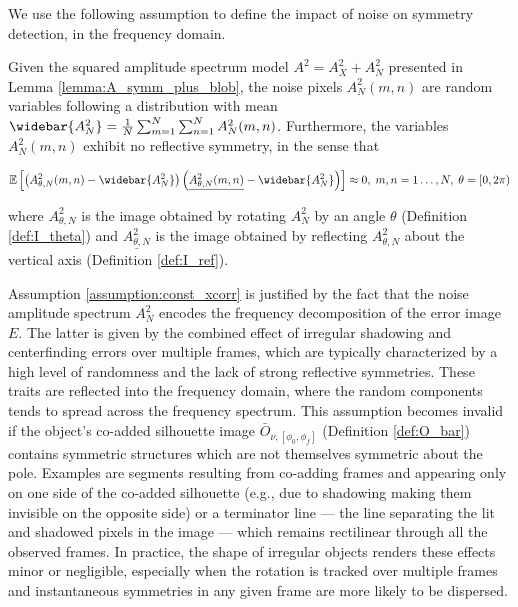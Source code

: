We use the following assumption to define the impact of noise on symmetry detection, in the frequency domain.

\begin{assumption}
\label{assumption:const_xcorr}
    Given the squared amplitude spectrum model $A^2 = A^2_{X} + A^2_N$ presented in Lemma \ref{lemma:A_symm_plus_blob}, the noise pixels $A^2_N(m,n)$ are random variables following a distribution with mean $\widebar{A^2_N}=\frac{1}{N}\sum_{m=1}^N\sum_{n=1}^N A^2_N(m,n)$. Furthermore, the variables $A^2_N(m,n)$ exhibit no reflective symmetry, in the sense that

\begin{equation}
        \mathbb{E}\left[ \left(A^2_{\theta,N}(m,n) - \widebar{A^2_N} \right) \left(\underline{A^2_{\theta,N}(m,n)} - \widebar{A^2_N} \right) \right] \approx 0,\; m,n=1\dots,N,\; \theta=[0,2\pi)
    \end{equation}
    
where $A^2_{\theta,N}$ is the image obtained by rotating $A^2_N$ by an angle $\theta$  (Definition \ref{def:I_theta}) and $\underline{A^2_{\theta,N}}$ is the image obtained by reflecting $A^2_{\theta,N}$ about the vertical axis (Definition \ref{def:I_ref}).
\end{assumption}

Assumption \ref{assumption:const_xcorr} is justified by the fact that the noise amplitude spectrum $A^2_N$ encodes the frequency decomposition of the error image $E$. The latter is given by the combined effect of irregular shadowing and centerfinding errors over multiple frames, which are typically characterized by a high level of randomness and the lack of strong reflective symmetries. These traits are reflected into the frequency domain, where the random components tends to spread across the frequency spectrum. This assumption becomes invalid if the object's co-added silhouette image $\bar{O}_{\nu,[\phi_0,\phi_f]}$ (Definition \ref{def:O_bar}) contains symmetric structures which are not themselves symmetric about the pole. Examples are segments resulting from co-adding frames and appearing only on one side of the co-added silhouette (e.g., due to shadowing making them invisible on the opposite side) or a terminator line --- the line separating the lit and shadowed pixels in the image --- which remains rectilinear through all the observed frames. In practice, the shape of irregular objects renders these effects minor or negligible, especially when the rotation is tracked over multiple frames and instantaneous symmetries in any given frame are more likely to be dispersed.


